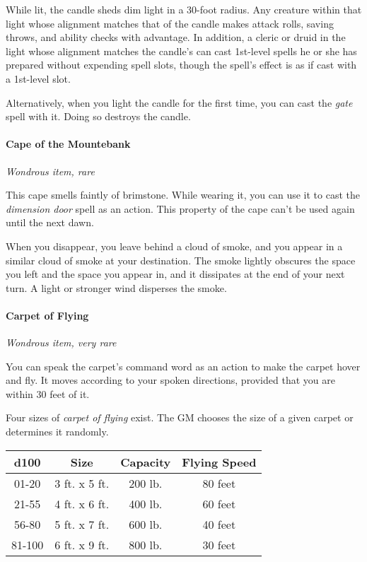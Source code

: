 \documentclass[
]{article}
\begin{document}
While lit, the candle sheds dim light in a 30-foot radius. Any creature
within that light whose alignment matches that of the candle makes
attack rolls, saving throws, and ability checks with advantage. In
addition, a cleric or druid in the light whose alignment matches the
candle's can cast 1st-level spells he or she has prepared without
expending spell slots, though the spell's effect is as if cast with a
1st-level slot.

Alternatively, when you light the candle for the first time, you can
cast the \emph{gate} spell with it. Doing so destroys the candle.

\hypertarget{cape-of-the-mountebank}{%
\paragraph{Cape of the Mountebank}\label{cape-of-the-mountebank}}

\emph{Wondrous item, rare}

This cape smells faintly of brimstone. While wearing it, you can use it
to cast the \emph{dimension door} spell as an action. This property of
the cape can't be used again until the next dawn.

When you disappear, you leave behind a cloud of smoke, and you appear in
a similar cloud of smoke at your destination. The smoke lightly obscures
the space you left and the space you appear in, and it dissipates at the
end of your next turn. A light or stronger wind disperses the smoke.

\hypertarget{carpet-of-flying}{%
\paragraph{Carpet of Flying}\label{carpet-of-flying}}

\emph{Wondrous item, very rare}

You can speak the carpet's command word as an action to make the carpet
hover and fly. It moves according to your spoken directions, provided
that you are within 30 feet of it.

Four sizes of \emph{carpet of flying} exist. The GM chooses the size of
a given carpet or determines it randomly.

\begin{longtable}[]{@{}cccc@{}}
\toprule
d100 & Size & Capacity & Flying Speed\tabularnewline
\midrule
\endhead
01-20 & 3 ft. x 5 ft. & 200 lb. & 80 feet\tabularnewline
21-55 & 4 ft. x 6 ft. & 400 lb. & 60 feet\tabularnewline
56-80 & 5 ft. x 7 ft. & 600 lb. & 40 feet\tabularnewline
81-100 & 6 ft. x 9 ft. & 800 lb. & 30 feet\tabularnewline
\bottomrule
\end{longtable}
\end{document}
